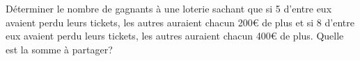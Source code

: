 
\begin{exercice}\label{exoPremiere-0025}

Déterminer le nombre de gagnants à une loterie sachant que si 5 d'entre eux avaient perdu leurs tickets, les autres auraient chacun 200€ de plus et si 8 d'entre eux avaient perdu leurs tickets, les autres auraient chacun 400€ de plus. Quelle est la somme à partager?

\end{exercice}
